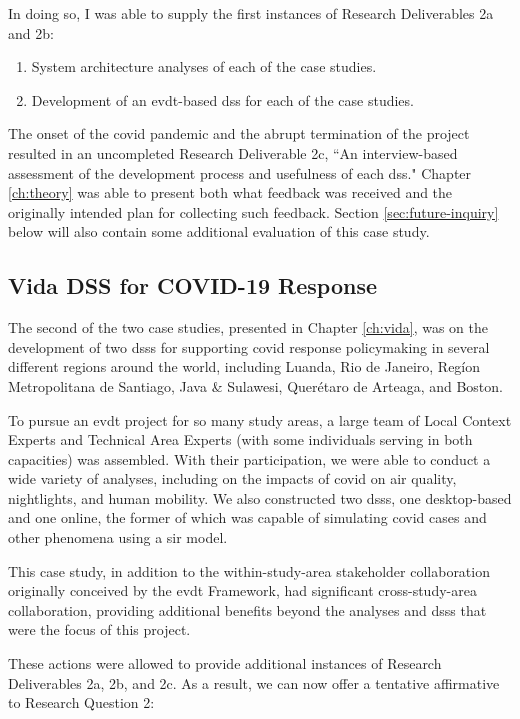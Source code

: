 In doing so, I was able to supply the first instances of Research Deliverables 2a and 2b:

\begin{enumerate}[label=\emph{\alph*},itemsep=0pt,parsep=0pt]
	\item{System architecture analyses of each of the case studies.} 
	\item{Development of an \ac{evdt}-based \ac{dss} for each of the case studies.} 
\end{enumerate}

The onset of the \ac{covid} pandemic and the abrupt termination of the project resulted in an uncompleted Research Deliverable 2c, ``An interview-based assessment of the development process and usefulness of each \ac{dss}." Chapter \ref{ch:theory} was able to present both what feedback was received and the originally intended plan for collecting such feedback. Section \ref{sec:future-inquiry} below will also contain some additional evaluation of this case study.

\subsection{Vida DSS for COVID-19 Response}

The second of the two case studies, presented in Chapter \ref{ch:vida}, was on the development of two \acp{dss} for supporting \ac{covid} response policymaking in several different regions around the world, including Luanda, Rio de Janeiro, Regíon Metropolitana de Santiago, Java \& Sulawesi, Querétaro de Arteaga, and Boston. 

To pursue an \ac{evdt} project for so many study areas, a large team of Local Context Experts and Technical Area Experts (with some individuals serving in both capacities) was assembled. With their participation, we were able to conduct a wide variety of analyses, including on the impacts of \ac{covid} on air quality, nightlights, and human mobility. We also constructed two \acp{dss}, one desktop-based and one online, the former of which was capable of simulating \ac{covid} cases and other phenomena using a \acf{sir} model. 

This case study, in addition to the within-study-area stakeholder collaboration originally conceived by the \ac{evdt} Framework, had significant cross-study-area collaboration, providing additional benefits beyond the analyses and \acp{dss} that were the focus of this project. 

These actions were allowed to provide additional instances of Research Deliverables 2a, 2b, and 2c. As a result, we can now offer a tentative affirmative to Research Question 2:

